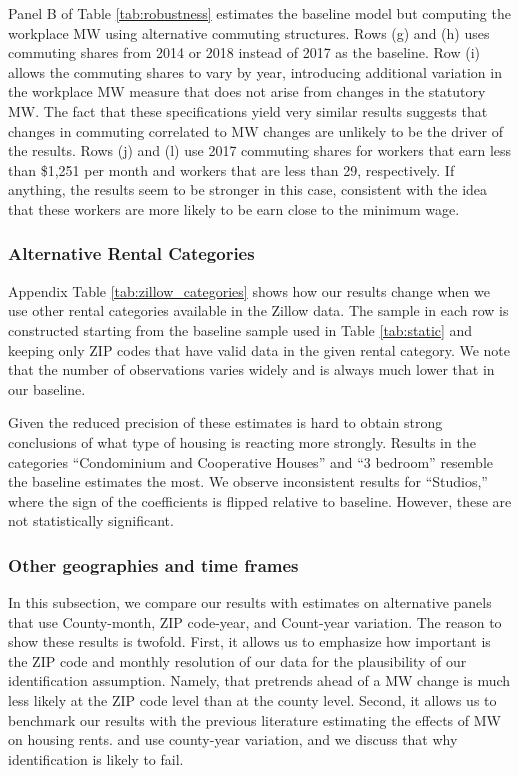 Panel B of Table \ref{tab:robustness} estimates the baseline model but 
computing the workplace MW using alternative commuting structures.
Rows (g) and (h) uses commuting shares from 2014 or 2018 instead of 2017 as 
the baseline.
Row (i) allows the commuting shares to vary by year, introducing additional
variation in the workplace MW measure that does not arise from changes in the
statutory MW.
The fact that these specifications yield very similar results suggests that 
changes in commuting correlated to MW changes are unlikely to be the driver
of the results.
Rows (j) and (l) use 2017 commuting shares for workers that earn less than 
\$1,251 per month and workers that are less than 29, respectively.
If anything, the results seem to be stronger in this case, consistent
with the idea that these workers are more likely to be earn close to the minimum
wage.

\subsubsection*{Alternative Rental Categories}

Appendix Table \ref{tab:zillow_categories} shows how our results change when we 
use other rental categories available in the Zillow data.
The sample in each row is constructed starting from the baseline sample used in 
Table \ref{tab:static} and keeping only ZIP codes that have valid data in the 
given rental category.
We note that the number of observations varies widely and is always much lower
that in our baseline.

Given the reduced precision of these estimates is hard to obtain strong 
conclusions of what type of housing is reacting more strongly.
Results in the categories ``Condominium and Cooperative Houses'' and ``3 bedroom''
resemble the baseline estimates the most.
We observe inconsistent results for ``Studios,'' where the sign of the 
coefficients is flipped relative to baseline.
However, these are not statistically significant.

\subsubsection*{Other geographies and time frames} \label{sec:oth_geo_time}

In this subsection, we compare our results with estimates on alternative panels
that use County-month, ZIP code-year, and Count-year variation. The reason to show 
these results is twofold. First, it allows us to emphasize how important 
is the ZIP code and monthly resolution of our data for the plausibility of our 
identification assumption. Namely, that pretrends ahead of a MW change is much 
less likely at the ZIP code level than at the county level. Second, it allows us 
to benchmark our results with the previous literature estimating the effects of 
MW on housing rents. \textcite{Yamagishi2019} and \textcite{Tidemann2018} use 
county-year variation, and we discuss that why identification is likely to fail.

